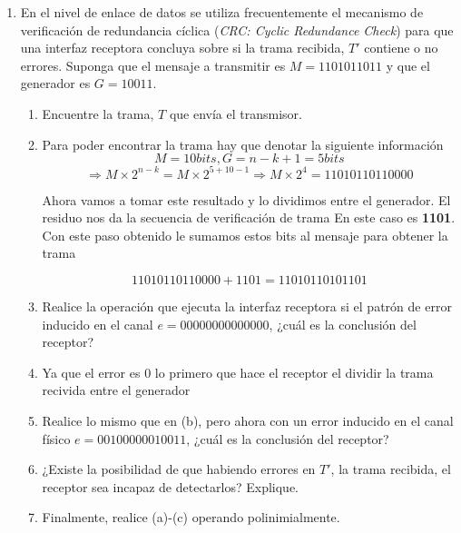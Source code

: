 \begin{enumerate}
    \item En el nivel de enlace de datos se utiliza frecuentemente el mecanismo de verificaci\'on de redundancia c\'iclica 
    (\textit{CRC: Cyclic Redundance Check}) para que una interfaz receptora concluya sobre si la trama recibida, \(T'\) contiene
    o no errores. Suponga que el mensaje a transmitir es \(M=1101011011\) y que el generador es \(G=10011\).
    \begin{enumerate}
        \item Encuentre la trama, \(T\) que env\'ia el transmisor.
        \item[] Para poder encontrar la trama hay que denotar la siguiente informaci\'on 
        \[
            M = 10 bits, G = n-k+1 = 5 bits
        \]
        \[
            \Rightarrow M \times 2^{n-k} = M \times 2^{5+10-1} \Rightarrow M \times 2^4 = 11010110110000
        \]

        Ahora vamos a tomar este resultado y lo dividimos entre el generador. El residuo nos da la secuencia de verificaci\'on de trama
        En este caso es \textbf{1101}. Con este paso obtenido le sumamos estos bits al mensaje para obtener la trama

        \[
            11010110110000+1101=11010110101101
        \]

        \item Realice la operaci\'on que ejecuta la interfaz receptora si el patr\'on de error inducido en el canal
        \(e=00000000000000\), ¿cu\'al es la conclusi\'on del receptor?
        \item[] Ya que el error es 0 lo primero que hace el receptor el dividir la trama recivida entre el generador
        

        \item Realice lo mismo que en (b), pero ahora con un error inducido en el canal f\'isico \(e=00100000010011\), 
        ¿cu\'al es la conclusi\'on del receptor?
        \item ¿Existe la posibilidad de que habiendo errores en \(T'\), la trama recibida, el receptor sea incapaz de detectarlos?
        Explique.
        \item Finalmente, realice (a)-(c) operando polinimialmente.
    \end{enumerate}
\end{enumerate}